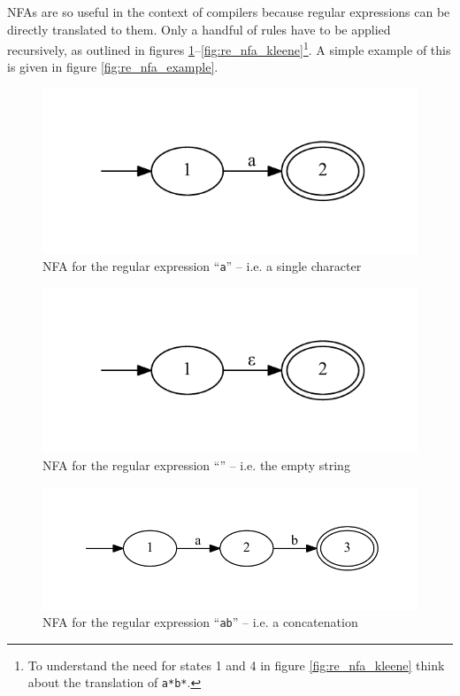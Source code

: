 			NFAs are so useful in the context of compilers because regular expressions can be directly translated to them. Only a handful of rules have to be applied recursively, as outlined in figures \ref{fig:re_nfa_char}--\ref{fig:re_nfa_kleene}\footnote{To understand the need for states 1 and 4 in figure \ref{fig:re_nfa_kleene} think about the translation of \lstinline$a*b*$.}. A simple example of this is given in figure \ref{fig:re_nfa_example}.
			
			
			\begin{figure}
			\centering
			\includegraphics{figures/re_char}
			\caption{NFA for the regular expression ``\lstinline$a$'' -- i.e. a single character}
			\label{fig:re_nfa_char}
			\end{figure}
			
			\begin{figure}
			\centering
			\includegraphics{figures/re_epsilon}
			\caption{NFA for the regular expression ``'' -- i.e. the empty string}
			\label{fig:re_nfa_epsilon}
			\end{figure}
			
			\begin{figure}
			\centering
			\includegraphics{figures/re_sequence}
			\caption{NFA for the regular expression ``\lstinline$ab$'' -- i.e. a concatenation}
			\label{fig:re_nfa_concatenation}
			\end{figure}
			
